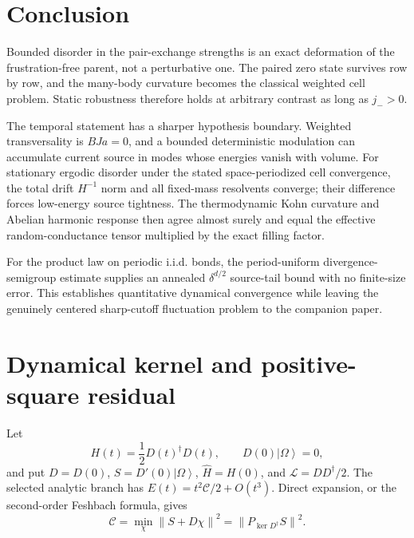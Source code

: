 \documentclass[11pt]{article}
\theoremstyle{definition}
\theoremstyle{remark}
\newcommand{\ket}[1]{\left|#1\right\rangle}
\newcommand{\cL}{\mathcal L}
\newcommand{\cC}{\mathcal C}
\newcommand{\norm}[1]{\left\lVert #1\right\rVert}
\begin{document}
\section{Conclusion}

Bounded disorder in the pair-exchange strengths is an exact deformation of the frustration-free parent, not a perturbative one.  The paired zero state survives row by row, and the many-body curvature becomes the classical weighted cell problem.  Static robustness therefore holds at arbitrary contrast as long as $j_->0$.

The temporal statement has a sharper hypothesis boundary.  Weighted transversality is $BJa=0$, and a bounded deterministic modulation can accumulate current source in modes whose energies vanish with volume.  For stationary ergodic disorder under the stated space-periodized cell convergence, the total drift $H^{-1}$ norm and all fixed-mass resolvents converge; their difference forces low-energy source tightness.  The thermodynamic Kohn curvature and Abelian harmonic response then agree almost surely and equal the effective random-conductance tensor multiplied by the exact filling factor.

For the product law on periodic i.i.d. bonds, the period-uniform divergence-semigroup estimate supplies an annealed $\delta^{d/2}$ source-tail bound with no finite-size error.  This establishes quantitative dynamical convergence while leaving the genuinely centered sharp-cutoff fluctuation problem to the companion paper.

\appendix

\section{Dynamical kernel and positive-square residual}
\label{app:curvature}

Let
\[
 H(t)=\frac12D(t)^\dagger D(t),\qquad D(0)\ket\Omega=0,
\]
and put $D=D(0)$, $S=D'(0)\ket\Omega$,
$\widehat H=H(0)$, and $\cL=DD^\dagger/2$.  The selected analytic branch has
$E(t)=t^2\cC/2+O(t^3)$.  Direct expansion, or the second-order Feshbach formula, gives
\begin{equation}
 \cC=\min_\chi\norm{S+D\chi}^2
 =\norm{P_{\ker D^\dagger}S}^2.
 \label{eq:positive-square-curvature}
\end{equation}
\end{document}
